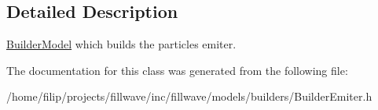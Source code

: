 \subsection{Detailed Description}
\hyperlink{classflw_1_1flf_1_1BuilderModel}{Builder\+Model} which builds the particles emiter. 

The documentation for this class was generated from the following file\+:\begin{DoxyCompactItemize}
\item 
/home/filip/projects/fillwave/inc/fillwave/models/builders/Builder\+Emiter.\+h\end{DoxyCompactItemize}
